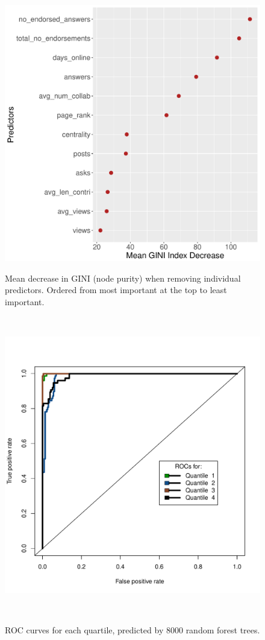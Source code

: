 \begin{figure}
\centering
  \includegraphics[width=0.8\columnwidth]{Figs/predImportanceLarge.pdf}
  \caption{Mean decrease in GINI (node purity) when removing
    individual predictors. Ordered from most important at the top to least
    important.}
  ~\label{fig:forPredImp}

  \includegraphics[width=0.8\columnwidth]{Figs/forumROCCurves.pdf}
  \caption{ROC curves for each quartile, predicted by 8000 random
    forest trees.}
  ~\label{fig:rocForum}
  

\end{figure}
